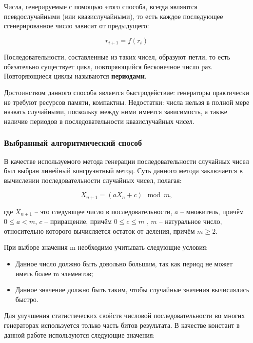 \documentclass[12pt]{report}
\begin{document}
Числа, генерируемые с помощью этого способа, всегда являются псевдослучайными (или квазислучайными), то есть каждое последующее сгенерированное число зависит от предыдущего:

\begin{equation}
	r_{i+1} = f(r_i)
\end{equation}

Последовательности, составленные из таких чисел, образуют петли, то есть обязательно существует цикл, повторяющийся бесконечное число раз. Повторяющиеся циклы называются \textbf{периодами}.

Достоинством данного способа является быстродействие: генераторы практически не требуют ресурсов памяти, компактны. Недостатки: числа нельзя в полной мере назвать случайными, поскольку между ними имеется зависимость, а также наличие периодов в последовательности квазислучайных чисел.

\subsubsection*{Выбранный алгоритмический способ}

В качестве используемого метода генерации последовательности случайных чисел был выбран линейный конгруэнтный метод.
Суть данного метода заключается в вычислении последовательности случайных чисел, полагая:

\begin{equation}
	X_{n+1} = (aX_n + c) \mod m,
\end{equation}

где $X_{n+1}$ – это следующее число в последовательности, $a$ – множитель, причём $0 \leq a < m$, $c$ – приращение, причём $0 \leq c \leq m$ , $m$ – натуральное число, относительно которого вычисляется остаток от деления, причём $m \geq 2$.

При выборе значения m необходимо учитывать следующие условия:
\begin{itemize}
	\item Данное число должно быть довольно большим, так как период не может иметь более m элементов;
	\item Данное значение должно быть таким, чтобы случайные значения вычислялись быстро.
\end{itemize}

Для улучшения статистических свойств числовой последовательности во многих генераторах используется только часть битов результата.
В качестве констант в данной работе используются следующие значения:
\end{document}
